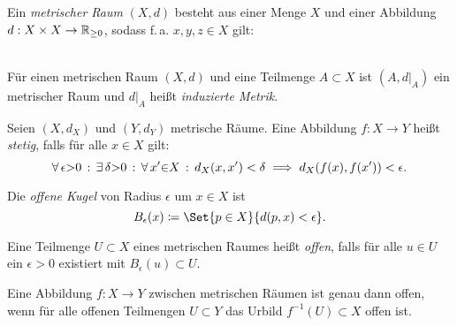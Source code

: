 \documentclass{cheat-sheet}
\newcommand{\Cont}{\mathcal{C}} %
\begin{document}



\begin{defn}
  Ein \emph{metrischer Raum} $(X, d)$ besteht aus einer Menge $X$ und einer Abbildung $d : X \times X \to \mathbb{R}_{\geq 0}$, sodass f.\,a. $x,y,z \in X$ gilt: \\
   \qquad
    \\
   
\end{defn}


\begin{defn}
  Für einen metrischen Raum $(X, d)$ und eine Teilmenge $A \subset X$ ist $(A, d|_A)$ ein metrischer Raum und $d|_A$ heißt \emph{induzierte Metrik}.
\end{defn}

\begin{defn}
  Seien $(X, d_X)$ und $(Y, d_Y)$ metrische Räume. Eine Abbildung $f : X \to Y$ heißt \emph{stetig}, falls für alle $x \in X$ gilt:
  \[ \forall \, {\epsilon {>} 0} \,:\, \exists \, {\delta {>} 0} \,:\, \forall \, {x' {\in} X} \,:\, d_X(x, x') < \delta \implies d_X(f(x), f(x')) < \epsilon. \]
\end{defn}

\begin{defn}
  Die \emph{offene Kugel} von Radius $\epsilon$ um $x \in X$ ist
  \[ B_\epsilon(x) \coloneqq \Set{ p \in X }{ d(p, x) < \epsilon }. \]
\end{defn}

\begin{defn}
  Eine Teilmenge $U \subset X$ eines metrischen Raumes heißt \emph{offen}, falls für alle $u \in U$ ein $\epsilon > 0$ existiert mit $B_{\epsilon}(u) \subset U$.
\end{defn}

\begin{prop}
  Eine Abbildung $f : X \to Y$ zwischen metrischen Räumen ist genau dann offen, wenn für alle offenen Teilmengen $U \subset Y$ das Urbild $f^{-1}(U) \subset X$ offen ist.
\end{prop}
\end{document}
